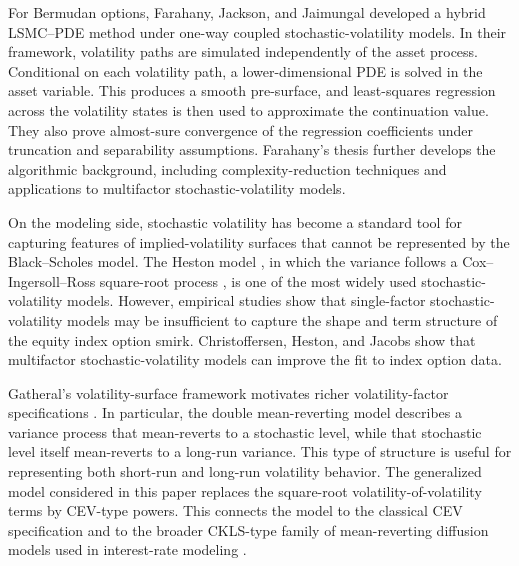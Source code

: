 \documentclass[10pt]{article}
\theoremstyle{plain}
\theoremstyle{definition}
\theoremstyle{remark}
\begin{document}
For Bermudan options, Farahany, Jackson, and Jaimungal \citep{farahany2020mixing} developed a hybrid LSMC--PDE method under one-way coupled stochastic-volatility models. In their framework, volatility paths are simulated independently of the asset process. Conditional on each volatility path, a lower-dimensional PDE is solved in the asset variable. This produces a smooth pre-surface, and least-squares regression across the volatility states is then used to approximate the continuation value. They also prove almost-sure convergence of the regression coefficients under truncation and separability assumptions. Farahany's thesis \citep{farahany2019thesis} further develops the algorithmic background, including complexity-reduction techniques and applications to multifactor stochastic-volatility models.

On the modeling side, stochastic volatility has become a standard tool for capturing features of implied-volatility surfaces that cannot be represented by the Black--Scholes model. The Heston model \citep{heston1993closedform}, in which the variance follows a Cox--Ingersoll--Ross square-root process \citep{cir1985termstructure}, is one of the most widely used stochastic-volatility models. However, empirical studies show that single-factor stochastic-volatility models may be insufficient to capture the shape and term structure of the equity index option smirk. Christoffersen, Heston, and Jacobs \citep{christoffersen2009smirk} show that multifactor stochastic-volatility models can improve the fit to index option data.

Gatheral's volatility-surface framework motivates richer volatility-factor specifications \citep{gatheral2006volatility,gatheral2006volsurface}. In particular, the double mean-reverting model describes a variance process that mean-reverts to a stochastic level, while that stochastic level itself mean-reverts to a long-run variance. This type of structure is useful for representing both short-run and long-run volatility behavior. The generalized model considered in this paper replaces the square-root volatility-of-volatility terms by CEV-type powers. This connects the model to the classical CEV specification \citep{cox1975cev} and to the broader CKLS-type family of mean-reverting diffusion models used in interest-rate modeling \citep{chan1992empirical}.
\end{document}
